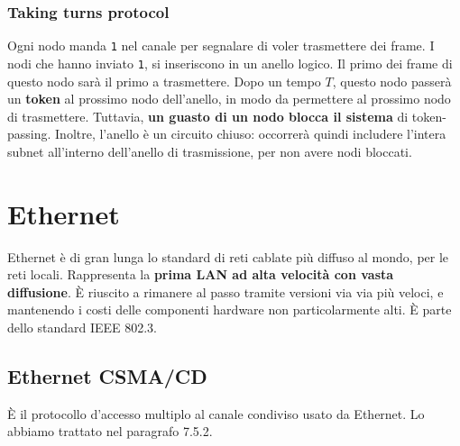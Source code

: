 \newpage

\subsubsection{Taking turns protocol}
Ogni nodo manda \verb|1| nel canale per segnalare di voler trasmettere dei frame. I nodi che hanno inviato \verb|1|, si inseriscono in un anello logico. Il primo dei frame di questo nodo sarà il primo a trasmettere. Dopo un tempo $T$, questo nodo passerà un \textbf{token} al prossimo nodo dell'anello, in modo da permettere al prossimo nodo di trasmettere. Tuttavia, \textbf{un guasto di un nodo blocca il sistema} di token-passing. Inoltre, l'anello è un circuito chiuso: occorrerà quindi includere l'intera subnet all'interno dell'anello di trasmissione, per non avere nodi bloccati.

\newpage

\section{Ethernet}
Ethernet è di gran lunga lo standard di reti cablate più diffuso al mondo, per le reti locali. Rappresenta la \textbf{prima LAN ad alta velocità con vasta diffusione}. È riuscito a rimanere al passo tramite versioni via via più veloci, e mantenendo i costi delle componenti hardware non particolarmente alti. È parte dello standard IEEE 802.3.

\subsection{Ethernet CSMA/CD}
È il protocollo d'accesso multiplo al canale condiviso usato da Ethernet. Lo abbiamo trattato nel paragrafo 7.5.2.

